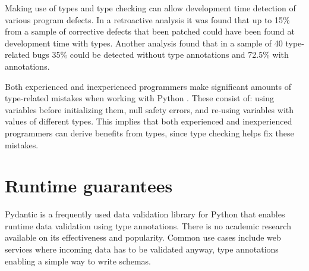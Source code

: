 Making use of types and type checking can allow development time detection of various program defects. In a retroactive analysis it was found that up to 15\% from a sample of corrective defects that been patched could have been found at development time with types\cite{khan_empirical_2022}. Another analysis \cite{xu_how_well_static_2023} found that in a sample of 40 type-related bugs 35\% could be detected without type annotations and 72.5\% with annotations.


Both experienced and inexperienced programmers make significant amounts of type-related mistakes when working with Python \cite{khan_empirical_2022}. These consist of: using variables before initializing them, null safety errors, and re-using variables with values of different types. This implies that both experienced and inexperienced programmers can derive benefits from types, since type checking helps fix these mistakes.


\section{Runtime guarantees}

Pydantic is a frequently used data validation library for Python that enables runtime data validation using type annotations\cite{pydanticdev_welcome_nodate}. There is no academic research available on its effectiveness and popularity. Common use cases include web services where incoming data has to be validated anyway, type annotations enabling a simple way to write schemas.


